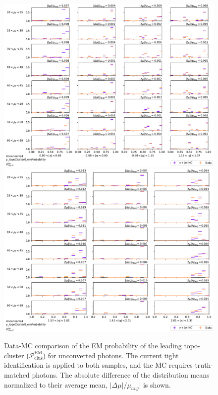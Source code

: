 \begin{figure}[!thp]
    \centering
    \includegraphics[width=.74\textwidth]{appendices/datamc_images/y_topoCluster0_emProbability_Unconverted_lowerEta.pdf}
    \includegraphics[width=.74\textwidth]{appendices/datamc_images/y_topoCluster0_emProbability_Unconverted_upperEta.pdf}
    \caption[Data-MC comparison of the \gls{EM} probability of the leading topo-cluster ($\mathcal{P}_{\text{clus}}^{\text{EM}}$) for unconverted photons]{Data-MC comparison of the \gls{EM} probability of the leading topo-cluster ($\mathcal{P}_{\text{clus}}^{\text{EM}}$) for unconverted photons. The current tight identification is applied to both samples, and the \gls{MC} requires truth-matched photons. The absolute difference of the distribution means normalized to their average mean, $|\Delta \mu|/\mu_{avg}|$ is shown.}
    \label{fig:dmc-u-emp}
\end{figure}




